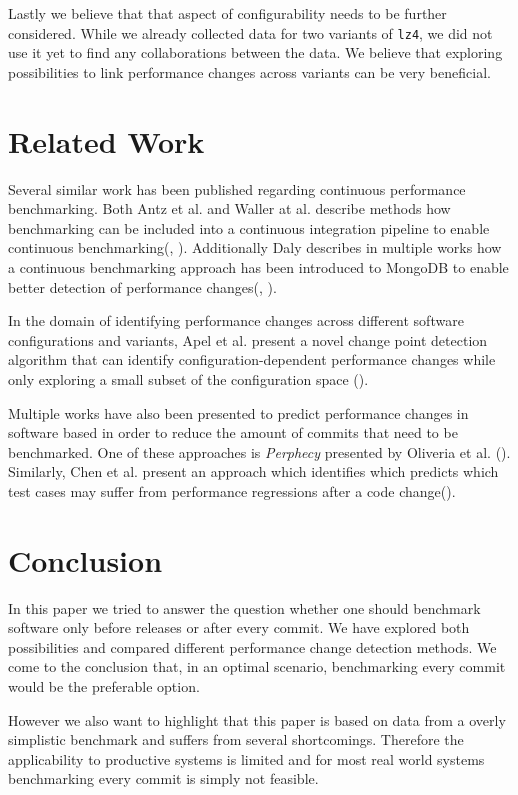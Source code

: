 \documentclass[	runningheads,
				a4paper]{llncs}
\begin{document}
	Lastly we believe that that aspect of configurability needs to be further considered. While we already collected data for two variants of \texttt{lz4}, we did not use it yet to find any collaborations between the data. We believe that exploring possibilities to link performance changes across variants can be very beneficial.

\section{Related Work}

Several similar work has been published regarding continuous performance benchmarking. Both Antz et al. and Waller at al. describe methods how benchmarking can be included into a continuous integration pipeline to enable continuous benchmarking(\cite{antz2019}, \cite{waller2015}). Additionally Daly describes in multiple works how a continuous benchmarking approach has been introduced to MongoDB to enable better detection of performance changes(\cite{daly2020}, \cite{daly2021}).

In the domain of identifying performance changes across different software configurations and variants, Apel et al. present a novel change point detection algorithm that can identify configuration-dependent performance changes while only exploring a small subset of the configuration space (\cite{apel2020}).

Multiple works have also been presented to predict performance changes in software based in order to reduce the amount of commits that need to be benchmarked. One of these approaches is \textit{Perphecy} presented by Oliveria et al. (\cite{oliveira2017}). Similarly, Chen et al. present an approach which identifies which predicts which test cases may suffer from performance regressions after a code change(\cite{chen2020}).

\section{Conclusion}

In this paper we tried to answer the question whether one should benchmark software only before releases or after every commit. We have explored both possibilities and compared different performance change detection methods. We come to the conclusion that, in an optimal scenario, benchmarking every commit would be the preferable option.

However we also want to highlight that this paper is based on data from a overly simplistic benchmark and suffers from several shortcomings. Therefore the applicability to productive systems is limited and for most real world systems benchmarking every commit is simply not feasible.
\end{document}
